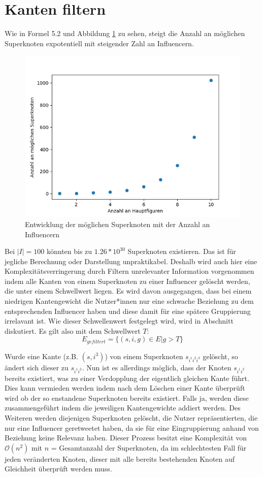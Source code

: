 \section{Kanten filtern}
\label{sec:kanten-filtern}
Wie in Formel 5.2 und Abbildung \ref{fig:superknotenentwicklung} zu sehen, steigt die Anzahl an möglichen Superknoten expotentiell mit steigender Zahl an Influencern.
\begin{figure}[h]
	\centering
	\includegraphics[width=0.7\linewidth]{images/Superknotenentwicklung}
	\caption{Entwicklung der möglichen Superknoten mit der Anzahl an Influencern}
	\label{fig:superknotenentwicklung}
\end{figure}
Bei $|I| = 100$ könnten bis zu $1.26*10^{30}$ Superknoten existieren. Das ist für jegliche Berechnung oder Darstellung unpraktikabel.
Deshalb wird auch hier eine Komplexitätsverringerung durch Filtern unrelevanter Information vorgenommen indem alle Kanten von einem Superknoten zu einer Influencer gelöscht werden, die unter einem Schwellwert liegen. 
Es wird davon ausgegangen, dass  bei einem niedrigen Kantengewicht die Nutzer*innen nur eine schwache Beziehung zu dem entsprechenden Influencer haben und diese damit für eine spätere Gruppierung irrelavant ist. 
Wie dieser Schwellenwert festgelegt wird, wird in Abschnitt diskutiert. 
Es gilt also mit dem Schwellwert $T$: \begin{equation}
	E_{gefiltert} = \{(s,i,g)\in E|g>T\}
\end{equation}

Wurde eine Kante (z.B. $(s,i^3)$) von einem Superknoten $s_{i^1i^2i^3}$ gelöscht, so ändert sich dieser zu $s_{i^1i^2}$. Nun ist es allerdings möglich, dass der Knoten $s_{i^1i^2}$ bereits existiert, was zu einer Verdopplung der eigentlich gleichen Kante führt. Dies kann vermieden werden indem nach dem Löschen einer Kante überprüft wird ob der so enstandene Superknoten bereits existiert. Falls ja, werden diese zusammengeführt indem die jeweiligen Kantengewichte addiert werden.
Des Weiteren werden diejenigen Superknoten gelöscht, die Nutzer repräsentierten, die nur eine Influencer \gls{geretweetet} haben, da sie für eine Eingruppierung anhand von Beziehung keine Relevanz haben.
Dieser Prozess besitzt eine Komplexität von $\mathcal{O}(n^2)$ mit $n$ = Gesamtanzahl der Superknoten, da im schlechtesten Fall für jeden veränderten Knoten, dieser mit alle bereits bestehenden Knoten auf Gleichheit überprüft werden muss.

